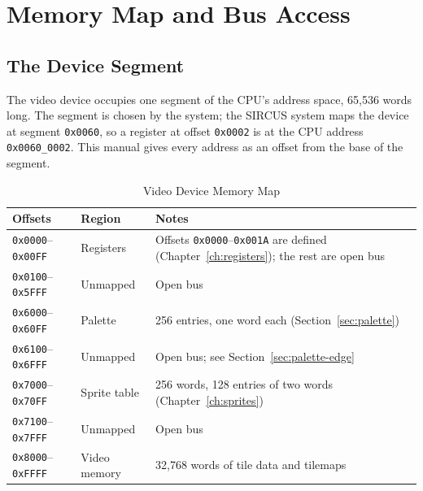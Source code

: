 \chapter{Memory Map and Bus Access}
\label{ch:memory-map}

\section{The Device Segment}

The video device occupies one segment of the CPU's address space, 65,536 words long. The segment is chosen by the
system; the SIRCUS system maps the device at segment \texttt{0x0060}, so a register at offset \texttt{0x0002} is at the
CPU address \texttt{0x0060\_0002}. This manual gives every address as an offset from the base of the segment.

\begin{table}[H]
	\centering
	\begin{tabular}{llp{6.5cm}}
		\toprule
		\textbf{Offsets}                 & \textbf{Region} & \textbf{Notes}                                                                                           \\
		\midrule
		\texttt{0x0000}--\texttt{0x00FF} & Registers       & Offsets \texttt{0x0000}--\texttt{0x001A} are defined (Chapter~\ref{ch:registers}); the rest are open bus \\
		\texttt{0x0100}--\texttt{0x5FFF} & Unmapped        & Open bus                                                                                                 \\
		\texttt{0x6000}--\texttt{0x60FF} & Palette         & 256 entries, one word each (Section~\ref{sec:palette})                                                   \\
		\texttt{0x6100}--\texttt{0x6FFF} & Unmapped        & Open bus; see Section~\ref{sec:palette-edge}                                                             \\
		\texttt{0x7000}--\texttt{0x70FF} & Sprite table    & 256 words, 128 entries of two words (Chapter~\ref{ch:sprites})                                           \\
		\texttt{0x7100}--\texttt{0x7FFF} & Unmapped        & Open bus                                                                                                 \\
		\texttt{0x8000}--\texttt{0xFFFF} & Video memory    & 32,768 words of tile data and tilemaps                                                                   \\
		\bottomrule
	\end{tabular}
	\caption{Video Device Memory Map}
	\label{tab:memory-map}
\end{table}

